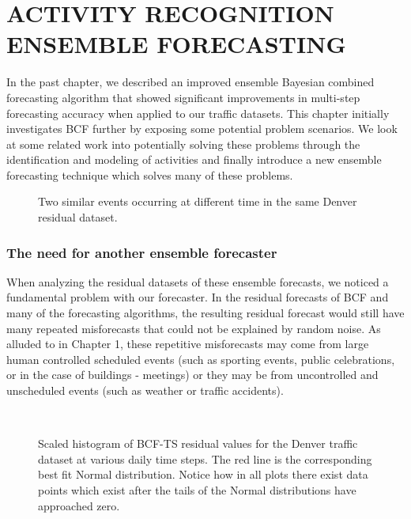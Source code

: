 \chapter{ACTIVITY RECOGNITION ENSEMBLE FORECASTING}
In the past chapter, we described an improved ensemble Bayesian combined forecasting algorithm that showed significant improvements in multi-step forecasting accuracy when applied to our traffic datasets.  This chapter initially investigates BCF further by exposing some potential problem scenarios.  We look at some related work into potentially solving these problems through the identification and modeling of activities and finally introduce a new ensemble forecasting technique which solves many of these problems.  

\begin{figure}[!b]
	\begin{center}
	\end{center}
	\caption{Two similar events occurring at different time in the same Denver residual dataset.}
	\label{fig:sample_residual_events}
\end{figure}


\subsection{The need for another ensemble forecaster}
When analyzing the residual datasets of these ensemble forecasts, we noticed a fundamental problem with our forecaster.  In the residual forecasts of BCF and many of the forecasting algorithms, the resulting residual forecast would still have many repeated misforecasts that could not be explained by random noise.  As alluded to in Chapter 1, these repetitive misforecasts may come from large human controlled scheduled events (such as sporting events, public celebrations, or in the case of buildings - meetings) or they may be from uncontrolled and unscheduled events (such as weather or traffic accidents).  

\begin{figure}[!t]
	\begin{center}
		 \\
	\end{center}
	\caption{Scaled histogram of BCF-TS residual values for the Denver traffic dataset at various daily time steps.  The red line is the corresponding best fit Normal distribution.  Notice how in all plots there exist data points which exist after the tails of the Normal distributions have approached zero.}
	\label{fig:denver_bcf_residual}
\end{figure}

